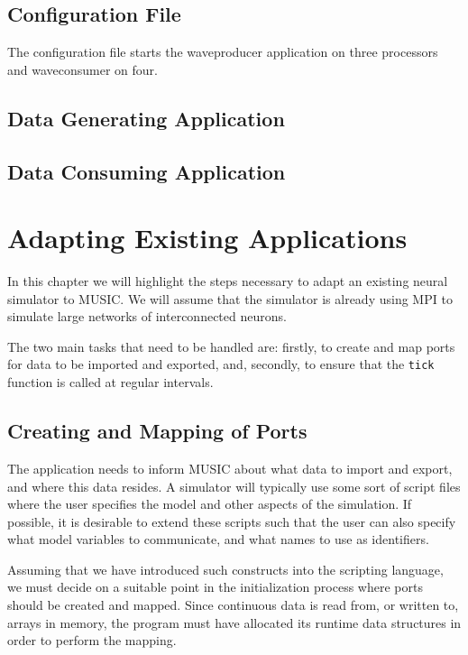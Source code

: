 \documentclass[a4paper]{report}
\begin{document}
\section{Configuration File}
\label{sec:conffile}

The configuration file starts the waveproducer application on three
processors and waveconsumer on four.




\section{Data Generating Application}




\section{Data Consuming Application}




\chapter{Adapting Existing Applications}

In this chapter we will highlight the steps necessary to adapt an
existing neural simulator to MUSIC.  We will assume that the simulator
is already using MPI to simulate large networks of interconnected
neurons.

The two main tasks that need to be handled are: firstly, to create and
map ports for data to be imported and exported, and, secondly, to
ensure that the \lstinline|tick| function is called at regular
intervals.


\section{Creating and Mapping of Ports}

The application needs to inform MUSIC about what data to import and
export, and where this data resides.  A simulator will typically use
some sort of script files where the user specifies the model and other
aspects of the simulation.  If possible, it is desirable to extend
these scripts such that the user can also specify what model variables
to communicate, and what names to use as identifiers.

Assuming that we have introduced such constructs into the scripting
language, we must decide on a suitable point in the initialization
process where ports should be created and mapped.  Since continuous
data is read from, or written to, arrays in memory, the program must
have allocated its runtime data structures in order to perform the
mapping.
\end{document}
